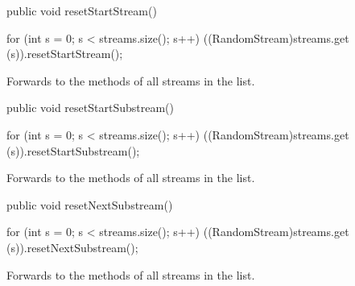 \begin{code}

   public void resetStartStream()\begin{hide} {
      for (int s = 0; s < streams.size(); s++)
         ((RandomStream)streams.get (s)).resetStartStream();
   }\end{hide}
\end{code}
\begin{tabb}   Forwards to the
  methods
 of all streams in the list.
\end{tabb}
\begin{code}

   public void resetStartSubstream()\begin{hide} {
      for (int s = 0; s < streams.size(); s++)
         ((RandomStream)streams.get (s)).resetStartSubstream();
   }\end{hide}
\end{code}
\begin{tabb}   Forwards to the
  methods
 of all streams in the list.
\end{tabb}
\begin{code}

   public void resetNextSubstream()\begin{hide} {
      for (int s = 0; s < streams.size(); s++)
         ((RandomStream)streams.get (s)).resetNextSubstream();
   }\end{hide}
\end{code}
\begin{tabb}   Forwards to the
  methods
 of all streams in the list.
\end{tabb}
\begin{code}\begin{hide}

   public String toString() {
      StringBuffer sb = new StringBuffer (getClass().getName());
      sb.append ('[');
      sb.append ("number of stored streams: ").append (streams.size());
      sb.append (']');
      return sb.toString();
   }
}\end{hide}
\end{code}
